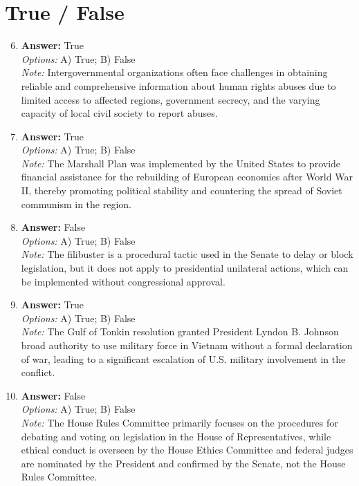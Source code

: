 \documentclass[12pt]{article}
\begin{document}
\section*{True / False}
\begin{enumerate}[label=\arabic*.]
\setcounter{enumi}{5}
\item \textbf{Answer:} True
\\ \textit{Options:} A) True; B) False
\\ \textit{Note:} Intergovernmental organizations often face challenges in obtaining reliable and comprehensive information about human rights abuses due to limited access to affected regions, government secrecy, and the varying capacity of local civil society to report abuses.
\item \textbf{Answer:} True
\\ \textit{Options:} A) True; B) False
\\ \textit{Note:} The Marshall Plan was implemented by the United States to provide financial assistance for the rebuilding of European economies after World War II, thereby promoting political stability and countering the spread of Soviet communism in the region.
\item \textbf{Answer:} False
\\ \textit{Options:} A) True; B) False
\\ \textit{Note:} The filibuster is a procedural tactic used in the Senate to delay or block legislation, but it does not apply to presidential unilateral actions, which can be implemented without congressional approval.
\item \textbf{Answer:} True
\\ \textit{Options:} A) True; B) False
\\ \textit{Note:} The Gulf of Tonkin resolution granted President Lyndon B. Johnson broad authority to use military force in Vietnam without a formal declaration of war, leading to a significant escalation of U.S. military involvement in the conflict.
\item \textbf{Answer:} False
\\ \textit{Options:} A) True; B) False
\\ \textit{Note:} The House Rules Committee primarily focuses on the procedures for debating and voting on legislation in the House of Representatives, while ethical conduct is overseen by the House Ethics Committee and federal judges are nominated by the President and confirmed by the Senate, not the House Rules Committee.
\end{enumerate}
\end{document}
